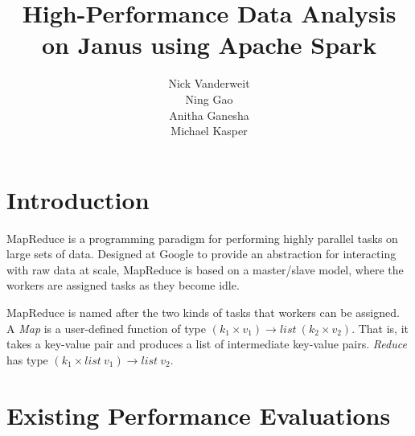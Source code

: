 \documentclass{article}
\title{High-Performance Data Analysis on Janus using Apache Spark}
\author{Nick Vanderweit \\
        Ning Gao \\
        Anitha Ganesha \\
        Michael Kasper}
\begin{document}
\maketitle

\begin{abstract}
\end{abstract}

\section*{Introduction}
MapReduce\citep{dean-mapreduce} is a programming paradigm for performing highly
parallel tasks on large sets of data. Designed at Google to provide an
abstraction for interacting with raw data at scale, MapReduce is based on
a master/slave model, where the workers are assigned tasks as they become idle.

MapReduce is named after the two kinds of tasks that workers can be assigned.
A \emph{Map} is a user-defined function of type
$(k_1 \times v_1) \rightarrow list \: (k_2 \times v_2)$.
That is, it takes a key-value pair and produces a list of
intermediate key-value pairs. \emph{Reduce} has type
$(k_1 \times list \: v_1) \rightarrow list \: v_2$.

\section*{Existing Performance Evaluations }
\end{document}
